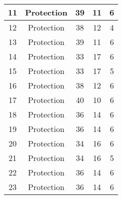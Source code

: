 \documentclass[results.tex]{subfiles}
\begin{document}
\begin{center}
\begin{tabular}{| c || c | c | c | c |}
            \hline
            11                      & Protection                   & 39                     & 11                      & 6                    \\
            \hline
            12                      & Protection                   & 38                     & 12                      & 4                    \\
            \hline
            13                      & Protection                   & 39                     & 11                      & 6                    \\
            \hline
            14                      & Protection                   & 33                     & 17                      & 6                    \\
            \hline
            15                      & Protection                   & 33                     & 17                      & 5                    \\
            \hline
            16                      & Protection                   & 38                     & 12                      & 6                    \\
            \hline
            17                      & Protection                   & 40                     & 10                      & 6                    \\
            \hline
            18                      & Protection                   & 36                     & 14                      & 6                    \\
            \hline
            19                      & Protection                   & 36                     & 14                      & 6                    \\
            \hline
            20                      & Protection                   & 34                     & 16                      & 6                    \\
            \hline
            21                      & Protection                   & 34                     & 16                      & 5                    \\
            \hline
            22                      & Protection                   & 36                     & 14                      & 6                    \\
            \hline
            23                      & Protection                   & 36                     & 14                      & 6                    \\

\end{tabular}
\end{center}
\end{document}

